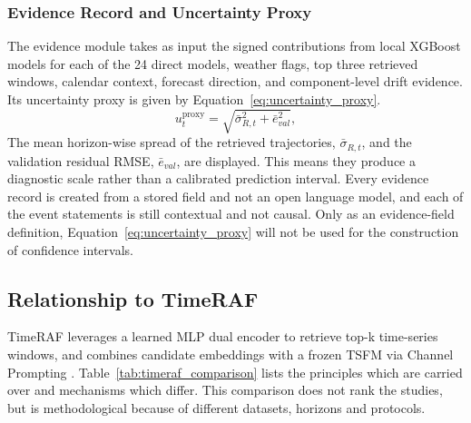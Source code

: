 \documentclass{ieeeaccess}
\begin{document}
\subsubsection{Evidence Record and Uncertainty Proxy}
The evidence module takes as input the signed contributions from local XGBoost models for each of the 24 direct models, weather flags, top three retrieved windows, calendar context, forecast direction, and component-level drift evidence. Its uncertainty proxy is given by Equation~\eqref{eq:uncertainty_proxy}.
\begin{equation}
u_t^{\mathrm{proxy}}=
\sqrt{\bar{\sigma}_{R,t}^{2}+\bar{e}_{val}^{2}},
\label{eq:uncertainty_proxy}
\end{equation}
The mean horizon-wise spread of the retrieved trajectories, $\bar{\sigma}_{R,t}$, and the validation residual RMSE, $\bar{e}_{val}$, are displayed. This means they produce a diagnostic scale rather than a calibrated prediction interval. Every evidence record is created from a stored field and not an open language model, and each of the event statements is still contextual and not causal. Only as an evidence-field definition, Equation~\eqref{eq:uncertainty_proxy} will not be used for the construction of confidence intervals.

\subsection{Relationship to TimeRAF}
TimeRAF leverages a learned MLP dual encoder to retrieve top-k time-series windows, and combines candidate embeddings with a frozen TSFM via Channel Prompting \cite{zhang2025timeraf}. Table~\ref{tab:timeraf_comparison} lists the principles which are carried over and mechanisms which differ. This comparison does not rank the studies, but is methodological because of different datasets, horizons and protocols.
\end{document}
